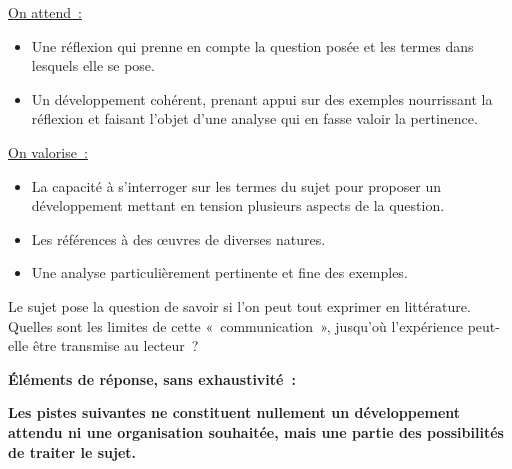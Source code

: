 {\underline{On attend~:}

\begin{itemize}
\item Une réflexion qui prenne en compte la question posée et les termes dans lesquels elle se pose.
\item Un développement cohérent, prenant appui sur des exemples nourrissant la réflexion et faisant
l'objet d'une analyse qui en fasse valoir la pertinence.
\end{itemize}
\underline{On valorise~:}
\begin{itemize}
\item La capacité à s'interroger sur les termes du sujet pour proposer un développement mettant en
tension plusieurs aspects de la question.
\item Les références à des œuvres de diverses natures.
\item Une analyse particulièrement pertinente et fine des exemples.
\end{itemize}

Le sujet pose la question de savoir si l'on peut tout exprimer en littérature. Quelles sont les limites
de cette «~communication~», jusqu'où l'expérience peut-elle être transmise au lecteur~?

\bigskip

\textbf{Éléments de réponse, sans exhaustivité~:}

\textbf{Les pistes suivantes ne constituent nullement un développement attendu ni une
organisation souhaitée, mais une partie des possibilités de traiter le sujet.}

}
